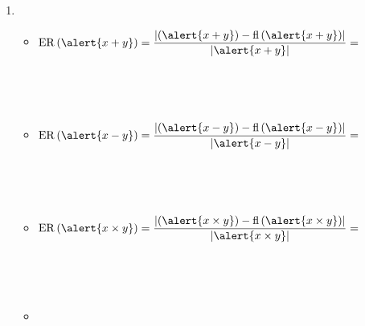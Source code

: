 \begin{frame}
\begin{solution}
\begin{enumerate}
			\item

			      \begin{itemize}
				      \item

				            \begin{math}
					            \operatorname{ER}\left(\alert{x+y}\right)=
					            \dfrac{
						            \left|
						            \left(\alert{x+y}\right)-
						            \operatorname{fl}\left(\alert{x+y}\right)
						            \right|
					            }{
						            \left|
						            \alert{x+y}
						            \right|
					            }=
				            \end{math}

				            \

				            \

				      \item

				            \begin{math}
					            \operatorname{ER}\left(\alert{x-y}\right)=
					            \dfrac{
						            \left|
						            \left(\alert{x-y}\right)-
						            \operatorname{fl}\left(\alert{x-y}\right)
						            \right|
					            }{
						            \left|
						            \alert{x-y}
						            \right|
					            }=
				            \end{math}

				            \

				            \

				      \item

				            \begin{math}
					            \operatorname{ER}
					            \left(\alert{x\times y}\right)=
					            \dfrac{
						            \left|
						            \left(\alert{x\times y}\right)-
						            \operatorname{fl}
						            \left(\alert{x\times y}\right)
						            \right|
					            }{
						            \left|
						            \alert{x\times y}
						            \right|
					            }=
				            \end{math}

				            \

				            \

				      \item


\end{itemize}
\end{enumerate}
\end{solution}
\end{frame}
